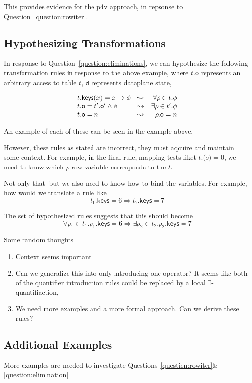 \documentclass{article}
\newcommand{\MatchRow}{\mathsf{keys}}
\begin{document}
This provides evidence for the p4v approach, in repsonse to Question~\ref{question:rowiter}.

\subsection{Hypothesizing Transformations}

In response to Question~\ref{question:eliminations}, we can hypothesize the
following transformation rules in response to the above example, where
\(t.\mathsf{o}\) represents an arbitrary access to table \(t\), \(\texttt{d}\)
represents dataplane state,

\[\begin{array}{l>{\leadsto}cr}
t.\MatchRow(x) = x \rightarrow \phi && \forall \rho \in t. \phi \\
t.\mathsf{o} = t'.\mathsf{o'} \wedge \phi && \exists \rho \in t'. \phi \\
t.\mathsf{o} = n && \rho.\mathsf{o} = n \\
\end{array}\]

An example of each of these can be seen in the example above.

However, these rules as stated are incorrect, they must aqcuire and maintain
some context. For example, in the final rule, mapping tests liket $t.\mathsf(o)
= 0$, we need to know which \(\rho\) row-variable corresponds to the \(t\).

Not only that, but we also need to know how to bind the variables. For example,
how would we translate a rule like
\[t_1.\MatchRow = 6 \Rightarrow t_2.\MatchRow = 7\]

The set of hypothesized rules suggests that this should become
\[\forall \rho_1 \in t_1. \rho_1.\MatchRow = 6 \Rightarrow \exists \rho_2 \in t_2. \rho_2.\MatchRow = 7\]

Some random thoughts
\begin{enumerate}
\item Context seems important
\item Can we generalize this into only introducing one operator? It seems like
  both of the quantifier introduction rules could be replaced by a local
  \(\exists\)-quantifiaction,
\item We need more examples and a more formal approach. Can we derive these rules?
\end{enumerate}



\subsection{Additional Examples}
More examples are needed to investigate
Questions~\ref{question:rowiter}\&\ref{question:elimination}.
\end{document}
